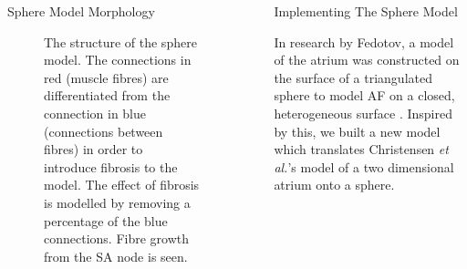 \documentclass[final,hyperref={pdfpagelabels=false}]{beamer}
\begin{document}
\begin{frame}[t]
\begin{columns}[t]
\begin{column}{.465\textwidth}
\begin{block}{Sphere Model Morphology}
\begin{figure}
\begin{columns}
\begin{column}{.67\textwidth}
\end{column}
\hspace{-6em}
\begin{column}{.3\textwidth}
\caption{The structure of the sphere model. The connections in red (muscle fibres) are differentiated from the connection in blue (connections between fibres) in order to introduce fibrosis to the model. The effect of fibrosis is modelled by removing a percentage of the blue connections. Fibre growth from the SA node is seen.}

\end{column}
\end{columns}
\end{figure}

\end{block}




\end{column} %

\begin{column}{.03\textwidth}\end{column} %
 
\begin{column}{.465\textwidth} %









\begin{block}{Implementing The Sphere Model}




In research by Fedotov, a model of the atrium was constructed on the surface of a triangulated sphere to model AF on a closed, heterogeneous surface \cite{Fedotov}. Inspired by this, we built a new model which translates Christensen \emph{et al.}'s model of a two dimensional atrium onto a sphere.




\end{block}
\end{column}
\end{columns}
\end{frame}
\end{document}
